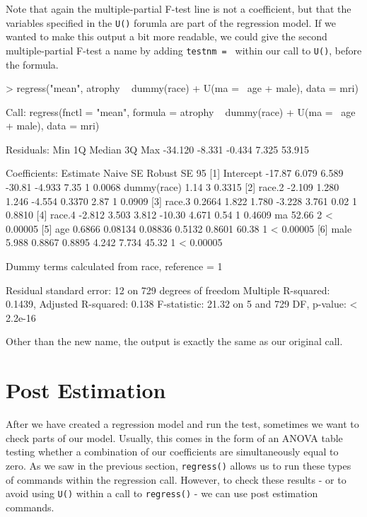 \documentclass[landscape]{article}
\renewenvironment{Schunk}{\vspace{\topsep}}{\vspace{\topsep}}
\begin{document}
Note that again the multiple-partial F-test line is not a coefficient, but that the variables specified in the \texttt{U()} forumla are part of the regression model. If we wanted to make this output a bit more readable, we could give the second multiple-partial F-test a name by adding \texttt{testnm = } within our call to \texttt{U()}, before the formula.
\begin{Schunk}
\begin{Sinput}
> regress("mean", atrophy ~ dummy(race) + U(ma = ~age + male), data = mri)
\end{Sinput}
\begin{Soutput}
Call:
regress(fnctl = "mean", formula = atrophy ~ dummy(race) + U(ma = ~age + 
    male), data = mri)

Residuals:
    Min      1Q  Median      3Q     Max 
-34.120  -8.331  -0.434   7.325  53.915 

Coefficients:
                   Estimate  Naive SE  Robust SE    95%
[1] Intercept       -17.87     6.079     6.589       -30.81    -4.933           7.35 1    0.0068 
    dummy(race)                                                                 1.14 3    0.3315 
[2]    race.2       -2.109     1.280     1.246       -4.554     0.3370          2.87 1    0.0909 
[3]    race.3        0.2664    1.822     1.780       -3.228     3.761           0.02 1    0.8810 
[4]    race.4       -2.812     3.503     3.812       -10.30     4.671           0.54 1    0.4609 
    ma                                                                         52.66 2  < 0.00005
[5]   age            0.6866   0.08134   0.08836       0.5132    0.8601         60.38 1  < 0.00005
[6]   male           5.988     0.8867    0.8895       4.242     7.734          45.32 1  < 0.00005

 Dummy terms calculated from race, reference = 1 

Residual standard error: 12 on 729 degrees of freedom
Multiple R-squared:  0.1439,	Adjusted R-squared:  0.138 
F-statistic: 21.32 on 5 and 729 DF,  p-value: < 2.2e-16
\end{Soutput}
\end{Schunk}

Other than the new name, the output is exactly the same as our original call. 

\section{Post Estimation}
After we have created a regression model and run the test, sometimes we want to check parts of our model. Usually, this comes in the form of an ANOVA table testing whether a combination of our coefficients are simultaneously equal to zero. As we saw in the previous section, \texttt{regress()} allows us to run these types of commands within the regression call. However, to check these results - or to avoid using \texttt{U()} within a call to \texttt{regress()} - we can use post estimation commands. 
\end{document}
